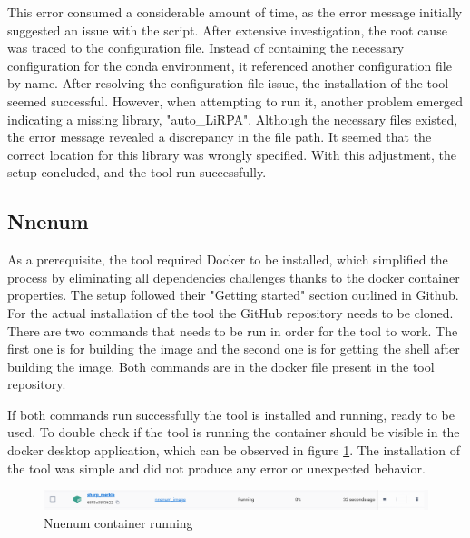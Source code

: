 \par This error consumed a considerable amount of time, as the error message initially suggested an issue with the script. After extensive investigation, the root cause was traced to the configuration file. Instead of containing the necessary configuration for the conda environment, it referenced another configuration file by name. After resolving the configuration file issue, the installation of the tool seemed successful. However, when attempting to run it, another problem emerged indicating a missing library, "auto\_LiRPA". Although the necessary files existed, the error message revealed a discrepancy in the file path. It seemed that the correct location for this library was wrongly specified. With this adjustment, the setup concluded, and the tool run successfully.

\subsection{Nnenum}

As a prerequisite, the tool required Docker to be installed, which simplified the process by eliminating all dependencies challenges thanks to the docker container properties. The setup followed their "Getting started" section outlined in Github. For the actual installation of the tool the GitHub repository needs to be cloned. There are two commands that needs to be run in order for the tool to work. The first one is for building the image and the second one is for getting the shell after building the image. Both commands are in the docker file present in the tool repository.

\par If both commands run successfully the tool is installed and running, ready to be used. To double check if the tool is running the container should be visible in the docker desktop application, which can be observed in figure \ref{Fig_NneumRunning}. The installation of the tool was simple and did not produce any error or unexpected behavior.

\begin{figure}[htbp]
	\centering
		\includegraphics[width=15cm]{./Figures/nnenumRunning.png}
	\caption{Nnenum container running}
	\label{Fig_NneumRunning}
\end{figure}